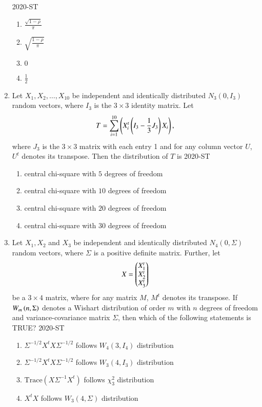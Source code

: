 \documentclass[journal]{IEEEtran}
\begin{document}
\begin{enumerate}
\hfill{2020-ST}
\begin{enumerate}
    \item $\frac{\sqrt{1 - \rho}}{\pi}$
    \item $\sqrt{\frac{1 - \rho}{\pi}}$
    \item $0$
    \item $\frac{1}{2}$
\end{enumerate}

\item Let $X_1, X_2, \dots, X_{10}$ be independent and identically distributed $N_3(0, I_3)$ random vectors, where $I_3$ is the $3 \times 3$ identity matrix. Let
\begin{align*}
T = \sum_{i=1}^{10} \left( X_i^t \left( I_3 - \frac{1}{3} J_3 \right) X_i\right),
\end{align*}
where $J_3$ is the $3 \times 3$ matrix with each entry 1 and for any column vector $U$, $U^t$ denotes its transpose. Then the distribution of $T$ is
\hfill{2020-ST}
\begin{enumerate}
    \item central chi-square with $5$ degrees of freedom
    \item central chi-square with $10$ degrees of freedom
    \item central chi-square with $20$ degrees of freedom
    \item central chi-square with $30$ degrees of freedom
\end{enumerate}

\item Let $X_1, X_2$ and $X_3$ be independent and identically distributed $N_4(0, \Sigma)$ random vectors, where $\Sigma$ is a positive definite matrix. Further, let 
\begin{align*}
X = \begin{pmatrix} X_1^t \\ X_2^t \\ X_3^t\end{pmatrix}
\end{align*}
be a $3 \times 4$ matrix, where for any matrix $M$, $M^t$ denotes its transpose. If $W_m\left(n, \Sigma\right)$ denotes a Wishart distribution of order $m$ with $n$ degrees of freedom and variance-covariance matrix $\Sigma$, then which of the following statements is TRUE?
\hfill{2020-ST}
\begin{enumerate}
    \item $\Sigma^{-1/2} X^t X \Sigma^{-1/2}$ follows $W_4(3, I_4)$ distribution
    \item $\Sigma^{-1/2} X^t X \Sigma^{-1/2}$ follows $W_3(4, I_3)$ distribution
    \item $\text{Trace} (X \Sigma^{-1} X^t)$ follows $\chi^2_3$ distribution
    \item $X^t X$ follows $W_3(4, \Sigma)$ distribution
\end{enumerate}


\end{enumerate}
\end{document}
